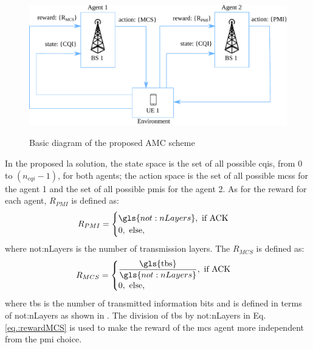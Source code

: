 %
\begin{figure}[!hb]
	\centerline{\includegraphics[height=60mm]{figures/chp_la/rl-framework-mateus.pdf}}
	\caption{Basic diagram of the proposed AMC scheme}
	\label{fig:la-rl-frame}
\end{figure}
%

In the proposed \gls{la} solution, the state space is the set of all possible \gls{cqi}s, from $0$ to $(n_{cqi}-1)$, for both agents; the action space is the set of all possible \gls{mcs}s for the agent 1 and the set of all possible \gls{pmi}s for the agent 2. As for the reward for each agent, $R_{PMI}$ is defined as:
%
\begin{equation}\label{eq.:rewardPMI}
R_{PMI} = \begin{cases}
\gls{not:nLayers}, \text{ if ACK} \\
0, \text{ else,}
\end{cases}
\end{equation}
%
\noindent where \gls{not:nLayers} is the number of transmission layers. The $R_{MCS}$ is defined as:
\begin{equation}\label{eq.:rewardMCS}
R_{MCS} = \begin{cases}
\dfrac{\textrm{\gls{tbs}}}{\gls{not:nLayers}}, \text{ if ACK} \\
0, \text{ else,}
\end{cases}
\end{equation}
\noindent where \gls{tbs} is the number of transmitted information bits and is defined in terms of \gls{not:nLayers} as shown in \cite{3gpp.38.214}.
%
The division of \gls{tbs} by \gls{not:nLayers} in Eq. \eqref{eq.:rewardMCS} is used to make the reward of the \gls{mcs} agent more independent from the \gls{pmi} choice.
%


